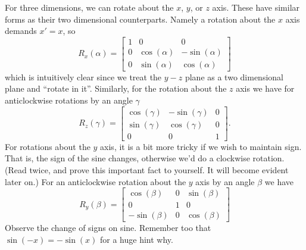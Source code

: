 For three dimensions, we can rotate about the $x$, $y$, or $z$
axis. These have similar forms as their two dimensional
counterparts. Namely a rotation about the $x$ axis demands
$x'=x$, so
\begin{equation}
R_{x}(\alpha) = \begin{bmatrix}1 & 0 & 0\\
0 & \cos(\alpha) & -\sin(\alpha)\\
0 & \sin(\alpha) & \cos(\alpha)\end{bmatrix}\end{equation}
which is intuitively clear since we treat the $y-z$ plane as a
two dimensional plane and ``rotate in it''. Similarly, for the
rotation about the $z$ axis we have for anticlockwise rotations
by an angle $\gamma$
\begin{equation}
R_{z}(\gamma) = \begin{bmatrix}\cos(\gamma) & -\sin(\gamma) & 0\\
\sin(\gamma) & \cos(\gamma) & 0\\
0 & 0 & 1\end{bmatrix}.
\end{equation}
For rotations about the $y$ axis, it is a bit more tricky if we
wish to maintain sign. That is, the sign of the sine changes,
otherwise we'd do a clockwise rotation. (Read twice, and prove
this important fact to yourself. It will become evident later
on.) For an anticlockwise rotation about the $y$ axis by an angle
$\beta$ we have
\begin{equation}
R_{y}(\beta) = \begin{bmatrix}\cos(\beta) & 0 & \sin(\beta)\\
0 & 1 & 0\\
-\sin(\beta) & 0 & \cos(\beta)\end{bmatrix}
\end{equation}
Observe the change of signs on sine. Remember too that
$\sin(-x)=-\sin(x)$ for a huge hint why.

